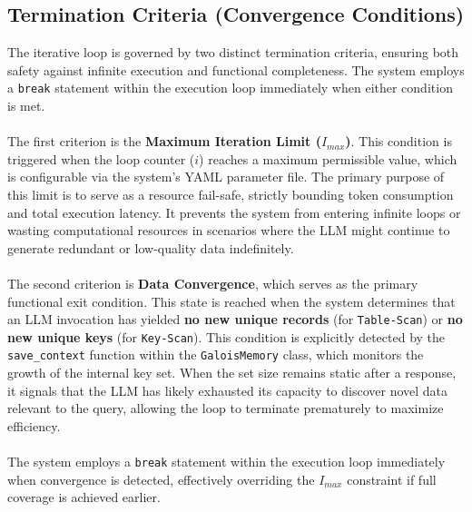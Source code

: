 \subsection{Termination Criteria (Convergence Conditions)}
The iterative loop is governed by two distinct termination criteria, ensuring both safety against infinite execution and functional completeness. The system employs a \texttt{break} statement within the execution loop immediately when either condition is met.
\\\\
The first criterion is the \textbf{Maximum Iteration Limit ($I_{max}$)}. This condition is triggered when the loop counter ($i$) reaches a maximum permissible value, which is configurable via the system's YAML parameter file. The primary purpose of this limit is to serve as a resource fail-safe, strictly bounding token consumption and total execution latency. It prevents the system from entering infinite loops or wasting computational resources in scenarios where the LLM might continue to generate redundant or low-quality data indefinitely.
\\\\
The second criterion is \textbf{Data Convergence}, which serves as the primary functional exit condition. This state is reached when the system determines that an LLM invocation has yielded \textbf{no new unique records} (for \texttt{Table-Scan}) or \textbf{no new unique keys} (for \texttt{Key-Scan}). This condition is explicitly detected by the \texttt{save\_context} function within the \texttt{GaloisMemory} class, which monitors the growth of the internal key set. When the set size remains static after a response, it signals that the LLM has likely exhausted its capacity to discover novel data relevant to the query, allowing the loop to terminate prematurely to maximize efficiency.
\\\\
The system employs a \texttt{break} statement within the execution loop immediately when convergence is detected, effectively overriding the $I_{max}$ constraint if full coverage is achieved earlier.